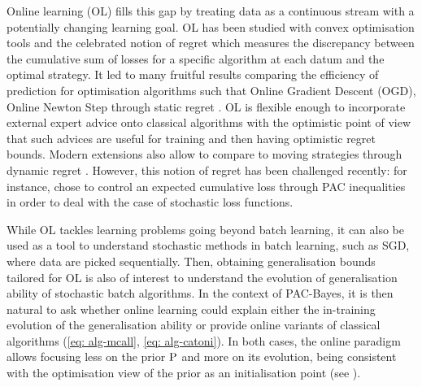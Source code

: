  Online learning (OL)  \citep{zinkevich2003online,shalev2012online,hazan2016introduction} fills this gap by treating data as a continuous stream with a potentially changing learning goal.
 OL has been studied with convex optimisation tools and the celebrated notion of regret which measures the discrepancy between the cumulative sum of losses for a specific algorithm at each datum and the optimal strategy. It led to many fruitful results comparing the  efficiency of prediction for optimisation algorithms such that Online Gradient Descent (OGD), Online Newton Step through static regret \citep{zinkevich2003online,hazan2007logarithmic}. OL is flexible enough to incorporate external expert advice onto classical algorithms with the optimistic point of view that such advices are useful for training \citep{rakhlin2013online,rakhlin2013practical} and then having optimistic regret bounds.
 Modern extensions also allow to compare to moving strategies through dynamic regret \citep[see e.g.][]{yang2016tracking,zhang2018strong,zhao2020dyn}. However, this notion of regret has been challenged recently: for instance, \citet{wintenberger2021stochastic} chose to control an expected cumulative loss through PAC inequalities in order to deal with the case of stochastic loss functions.

While OL tackles learning problems going beyond batch learning, it can also be used as a tool to understand stochastic methods in batch learning, such as SGD, where data are picked sequentially. Then, obtaining generalisation bounds tailored for OL is also of interest to understand the evolution of generalisation ability of stochastic batch algorithms. In the context of PAC-Bayes, it is then natural to ask whether online learning could explain either the in-training evolution of the generalisation ability or provide online variants of classical algorithms (\eg \eqref{eq: alg-mcall}, \eqref{eq: alg-catoni}). In both cases, the online paradigm allows focusing less on the prior $\P$ and more on its evolution, being consistent with the optimisation view of the prior as an initialisation point (see ). 


